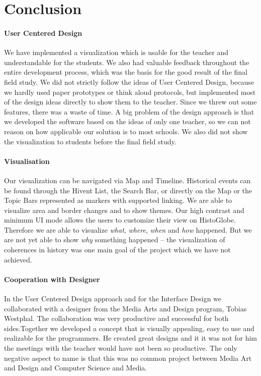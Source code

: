 \section{Conclusion} %
\label{sec:conclusion}

\paragraph{User Centered Design} %
We have implemented a visualization which is usable for the teacher and understandable for the students. We also had valuable feedback throughout the entire development process, which was the basis for the good result of the final field study. We did not strictly follow the ideas of User Centered Design, because we hardly used paper prototypes or think aloud protocols, but implemented most of the design ideas directly to show them to the teacher. Since we threw out some features, there was a waste of time. A big problem of the design approach is that we developed the software based on the ideas of only one teacher, so we can not reason on how applicable our solution is to most schools. We also did not show the visualization to students before the final field study.

\paragraph{Visualisation} %
Our visualization can be navigated via Map and Timeline. Historical events can be found through the Hivent List, the Search Bar, or directly on the Map or the Topic Bars represented as markers with supported linking. We are able to visualize area and border changes and to show themes. Our high contrast and minimum UI mode allows the users to customize their view on HistoGlobe. Therefore we are able to visualize \textit{what}, \textit{where}, \textit{when} and \textit{how} happened. But we are not yet able to show \textit{why} something happened -- the visualization of coherences in history was one main goal of the project which we have not achieved.

\paragraph{Cooperation with Designer} %
In the User Centered Design approach and for the Interface Design we collaborated with a designer from the Media Arts and Design program, Tobias Westphal. The collaboration was very productive and successful for both sides.Together we developed a concept that is visually appealing, easy to use and realizable for the programmers. He created great designs and it it was not for him the meetings with the teacher would have not been so productive. The only negative aspect to name is that this was no common project between Media Art and Design and Computer Science and Media.

